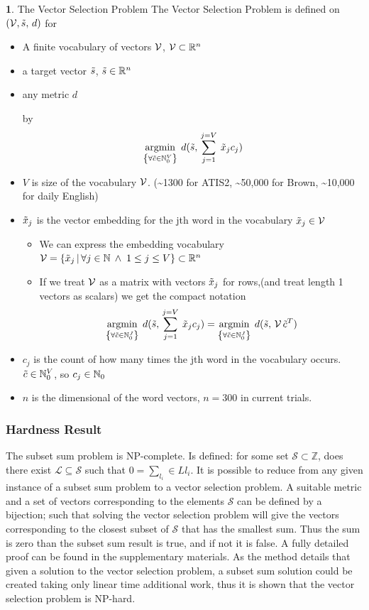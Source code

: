 \documentclass[]{scrartcl}
\numberwithin{equation}{section}
\numberwithin{figure}{section}
\theoremstyle{plain}
\theoremstyle{definition}
\newtheorem{defn}[thm]{\protect\definitionname}
\providecommand{\definitionname}{Definition}
\DeclareMathOperator*{\argmin}{argmin}
\begin{document}
\begin{defn}{The Vector Selection Problem}
	The Vector Selection Problem is defined on $(\mathcal{V}, \tilde{s},\,d)$ for
	\begin{itemize}
		\item A finite vocabulary of vectors $\mathcal{V}$, $\mathcal{V}\subset{\mathbb{R}}^{n}$
		\item a target vector $ \tilde{s}$, $ \tilde{s}\in\mathbb{R}^{n}$
		\item any metric $d$ 
		
		by
		\[
		\argmin_{\left\{ \forall\c\in\N_{0}^{V}\right\} }\:d( \s,\,\sum_{j=1}^{j=V}\:\x_{j}c_{j})
		\]
		
		\medskip{}
				
		\item $V$ is size of the vocabulary $\mathcal{V}$. (\textasciitilde{}1300
		for ATIS2, \textasciitilde{}50,000 for Brown, \textasciitilde{}10,000
		for daily English) 
		\item $\tilde{x}_{j}$ is the vector embedding for the jth word in the vocabulary
		$\tilde{x}_{j}\in\mathcal{V}$ 
		
		\begin{itemize}
			\item We can express the embedding vocabulary $\mathcal{V}=\{\tilde{x}_{j}\,|\,\forall j\in\mathbb{N}\:\wedge\;1\le j\le V\}\subset\mathbb{R}^{n}$
			\item If we treat $\mathcal{V}$ as a matrix with vectors $\tilde{x}_{j}$
			for rows,(and treat length 1 vectors as scalars) we get the compact
			notation 
			\[
			\argmin_{\left\{ \forall\tilde{c}\in\N_{0}^{J}\right\} }\:d(\s,\,\sum_{j=1}^{j=V}\:\x_{j}c_{j})=\argmin_{\left\{ \forall\tilde{c}\in\N_{0}^{J}\right\} }\:d(\s,\,\V\,\c^{T})
			\]
			
		\end{itemize}
		\item $c_{j}$ is the count of how many times the jth word in the vocabulary
		occurs. $\tilde{c}\in\mathbb{N}_{0}^{V}$, so $c_{j}\in\mathbb{N}_{0}$
		\item $n$ is the dimensional of the word vectors, $n=300$ in current trials. \end{itemize}
\end{defn}

\subsubsection{Hardness Result}
The subset sum problem is NP-complete\cite{karp1972reducibility}. Is defined: for some set $\mathcal{S}\subset\mathbb{Z}$, does there exist $\mathcal{L}\subseteq\mathcal{S}$ such that $0=\sum_{l_i}\in L l_i$.  It is possible to reduce from any given instance of a subset sum problem to a vector selection problem. A suitable metric and a set of vectors corresponding to the elements $\mathcal{S}$ can be defined by a bijection; such that solving the vector selection problem will give the vectors corresponding to the closest subset of $\mathcal{S}$ that has the smallest sum. Thus the sum is zero than the subset sum result is true, and if not it is false. A fully detailed proof can be found in the supplementary materials. As the method details that given a solution to the vector selection problem, a subset sum solution could be created taking only linear time additional work, thus it is shown that the vector selection problem is NP-hard.
\end{document}
